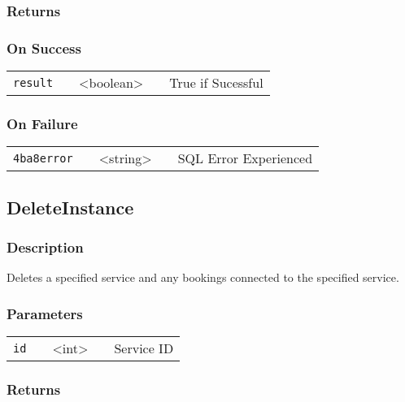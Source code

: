 \documentclass[a4paper,12pt]{article}
\begin{document}
\subsubsection{Returns}

\subsubsection{On Success}

\begin{tabular}{ccccc}
\verb!result! & \vspace{15mm} & <boolean> & \vspace{15mm} & True if Sucessful \\
\end{tabular}

\subsubsection{On Failure}

\begin{tabular}{ccccc}
\verb!4ba8error! & \vspace{15mm} & <string> & \vspace{15mm} & SQL Error Experienced \\
\end{tabular}


\subsection{DeleteInstance}

\subsubsection{Description}

Deletes a specified service and any bookings connected to the specified
service.

\subsubsection{Parameters}

\begin{tabular}{ccccc}
\verb!id! & \vspace{15mm} & <int> & \vspace{15mm} & Service ID \\
\end{tabular}

\subsubsection{Returns}
\end{document}
